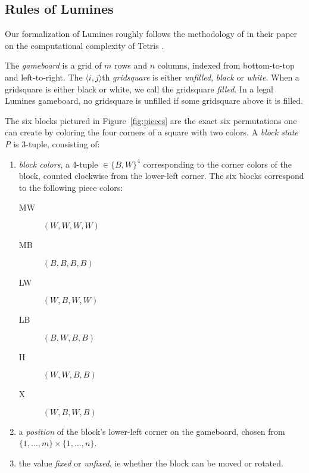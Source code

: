 \subsection{Rules of Lumines}
Our formalization of Lumines roughly follows the methodology of \citeauthor{tetris} in their paper on the computational complexity of Tetris \cite{tetris}.

\begin{description}[style=unboxed, leftmargin=0cm,labelsep=1em]
    \item[The gameboard] The \emph{gameboard} is a grid of $m$ rows and $n$ columns, indexed from bottom-to-top and left-to-right. The $\langle i,j \rangle$th \emph{gridsquare} is either \emph{unfilled}, \emph{black} or \emph{white}. When a gridsquare is either black or white, we call the gridsquare \emph{filled}. In a legal Lumines gameboard, no gridsquare is unfilled if some gridsquare above it is filled.

    \item[Game pieces] The six blocks pictured in Figure~\ref{fig:pieces} are the exact six permutations one can create by coloring the four corners of a square with two colors. A \emph{block state P} is 3-tuple, consisting of: 

    \begin{enumerate}
        \item \emph{block colors}, a 4-tuple $\in \{B,W\}^4$ corresponding to the corner colors of the block, counted clockwise from the lower-left corner. The six blocks correspond to the following piece colors:

        \begin{description}
            \item[MW] $(W,W,W,W)$
            \item[MB] $(B,B,B,B)$
            \item[LW] $(W,B,W,W)$
            \item[LB] $(B,W,B,B)$
            \item[H] $(W,W,B,B)$
            \item[X] $(W,B,W,B)$
        \end{description}

        \item a \emph{position} of the block's lower-left corner on the gameboard, chosen from $\{1, \ldots, m\} \times \{1, \ldots, n\}$.
        \item the value \emph{fixed} or \emph{unfixed}, ie whether the block can be moved or rotated.
    \end{enumerate}


\end{description}
